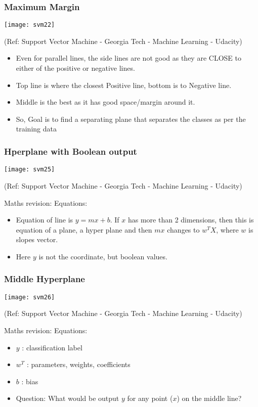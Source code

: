 \begin{frame}[fragile] \frametitle{Maximum Margin}
\begin{center}
\texttt{[image: svm22]}

\tiny{(Ref: Support Vector Machine - Georgia Tech - Machine Learning - Udacity)}
\end{center}


\begin{itemize}
\item Even for parallel lines, the side lines are not good as they are CLOSE to either of the positive or negative lines.
\item Top line is where the closest Positive line, bottom is to Negative line. 
\item Middle is the best as it has good space/margin around it.
\item So, Goal is to find a separating plane that separates the classes as per the training data
\end{itemize}
\end{frame}


\begin{frame}[fragile] \frametitle{Hperplane with Boolean output}
\begin{center}
\texttt{[image: svm25]}

\tiny{(Ref: Support Vector Machine - Georgia Tech - Machine Learning - Udacity)}
\end{center}

Maths revision: Equations:
\begin{itemize}
\item Equation of line is $y = mx + b$.  If $x$ has more than 2 dimensions, then this is equation of a plane, a hyper plane and then $mx$ changes to $w^TX$, where $w$ is slopes vector.
\item Here $y$ is not the coordinate, but boolean values.
\end{itemize}
\end{frame}

\begin{frame}[fragile] \frametitle{Middle Hyperplane}
\begin{center}
\texttt{[image: svm26]}

\tiny{(Ref: Support Vector Machine - Georgia Tech - Machine Learning - Udacity)}
\end{center}

Maths revision: Equations:
\begin{itemize}
\item $y$ : classification label
\item $w^T$ : parameters, weights, coefficients
\item $b$ : bias
\item Question: What would be output $y$ for any point ($x$) on the middle line?
\end{itemize}
\end{frame}

